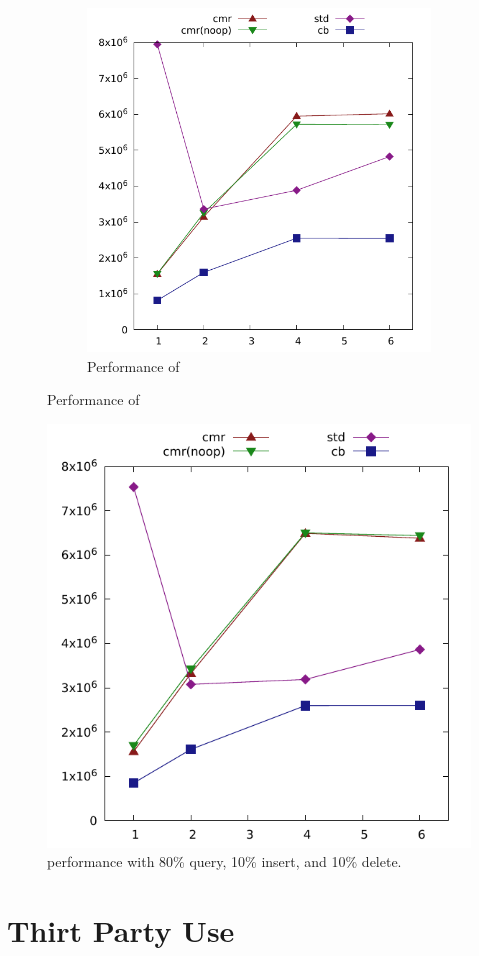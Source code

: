 \begin{figure}[ht]
\begin{subfigure}{0.49\linewidth}
    \includegraphics[width=\linewidth]{graphs/lurifax-hm-contains.pdf}
    \caption{Performance of }
  \end{subfigure}
\end{figure}

\begin{figure}[ht]
\centering
\includegraphics[width=0.49\linewidth]{graphs/lurifax-hm-80-10-10.pdf}
\caption{ performance with 80\% query, 10\% insert, and 10\% delete.}
\end{figure}


\section{Thirt Party Use}
\lorem{}
